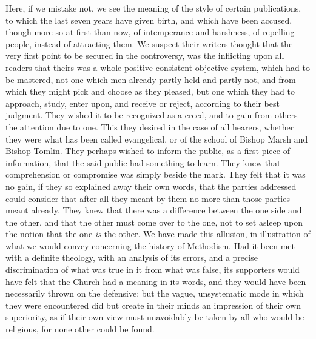 Here, if we mistake not, we see the meaning of
the style of certain publications, to which the last seven years have
given birth, and which have been accused, though more so at first than
now, of intemperance and harshness, of repelling people, instead of
attracting them. We suspect their writers thought that the very first
point to be secured in the controversy, was the inflicting upon all
readers that theirs was a whole positive consistent objective system,
which had to be mastered, not one which men already partly held and
partly not, and from which they might pick and choose as they pleased,
but one which they had to approach, study, enter upon, and receive or
reject, according to their best judgment. They wished it to be
recognized as a creed, and to gain from others the attention due to
one. This they desired in the case of all hearers, whether they were
what has been called evangelical, or of the school of Bishop Marsh and
Bishop Tomlin. They perhaps wished to inform the public, as a first
piece of information, that the said public had something to learn.
They knew that comprehension or compromise was simply beside the mark.
They felt that it was no gain, if they so explained away their
own words, that the parties addressed could consider that after all
they meant by them no more than those parties meant already. They knew
that there was a difference between the one side and the other, and
that the other must come over to the one, not to set asleep upon the
notion that the one \emph{is} the other. We have made this allusion,
in illustration of what we would convey concerning the history of
Methodism. Had it been met with a definite theology, with an analysis
of its errors, and a precise discrimination of what was true in it
from what was false, its supporters would have felt that the Church
had a meaning in its words, and they would have been necessarily
thrown on the defensive; but the vague, unsystematic mode in which
they were encountered did but create in their minds an impression of
their own superiority, as if their own view must unavoidably be taken
by all who would be religious, for none other could be found.


